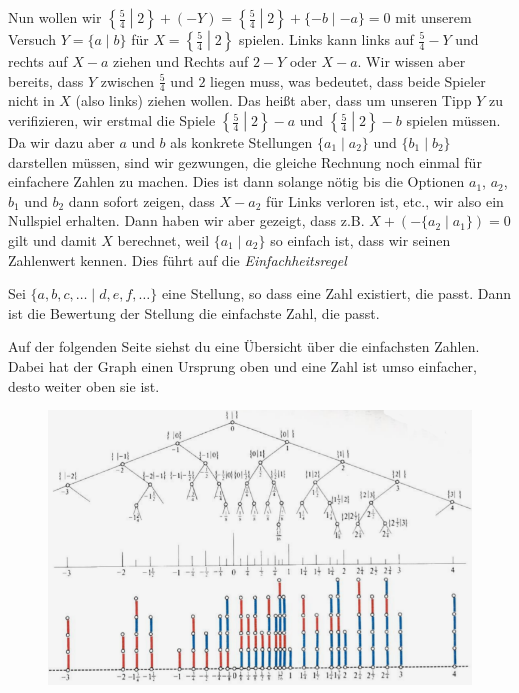 \documentclass{zirkelbrief1516}
\begin{document}
Nun wollen wir $\left\{\frac{5}{4}\middle|2\right\}+(-Y)=\left\{\frac{5}{4}\middle|2\right\}+\{-b\mid -a\}=0$ mit unserem Versuch $Y=\{a\mid b\}$ für $X=\left\{\frac{5}{4}\middle|2\right\}$ spielen. Links kann links auf $\frac{5}{4}-Y$ und rechts auf $X-a$ ziehen und Rechts auf $2-Y$ oder $X-a$. Wir wissen aber bereits, dass $Y$ zwischen $\frac{5}{4}$ und $2$ liegen muss, was bedeutet, dass beide Spieler nicht in $X$ (also links) ziehen wollen. Das heißt aber, dass um unseren Tipp $Y$ zu verifizieren, wir erstmal die Spiele $\left\{\frac{5}{4}\middle|2\right\}-a$ und $\left\{\frac{5}{4}\middle|2\right\}-b$ spielen müssen. Da wir dazu aber $a$ und $b$ als konkrete Stellungen $\{a_1\mid a_2\}$ und $\{b_1\mid b_2\}$ darstellen müssen, sind wir gezwungen, die gleiche Rechnung noch einmal für einfachere Zahlen zu machen. Dies ist dann solange nötig bis die Optionen $a_1$, $a_2$, $b_1$ und $b_2$ dann sofort zeigen, dass $X-a_2$ für Links verloren ist, etc., wir also ein Nullspiel erhalten. Dann haben wir aber 
gezeigt, dass z.B. $X+(-\{a_2\mid a_1\})=0$ gilt und damit $X$ berechnet, weil $\{a_1\mid a_2\}$ so einfach ist, dass wir seinen Zahlenwert kennen. Dies führt auf die \emph{Einfachheitsregel}
\begin{thm}
  Sei $\{a,b,c,\ldots\mid d,e,f,\ldots\}$ eine Stellung, so dass eine Zahl existiert, die passt. Dann ist die Bewertung der Stellung die einfachste Zahl, die passt. 
\end{thm}

Auf der folgenden Seite siehst du eine Übersicht über die einfachsten Zahlen. Dabei hat der Graph einen Ursprung oben und eine Zahl ist umso einfacher, desto weiter oben sie ist.

\begin{figure}[!h]
  \centering
  \includegraphics[width=\textwidth]{simple_numbers.png}
  \label{fig:simple_numbers}
\end{figure}
\end{document}
